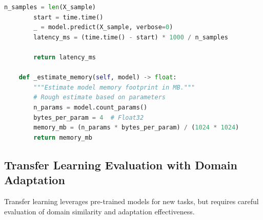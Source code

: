 \begin{lstlisting}[language=Python, caption={NAS with Deployment Constraints}]
        n_samples = len(X_sample)
        start = time.time()
        _ = model.predict(X_sample, verbose=0)
        latency_ms = (time.time() - start) * 1000 / n_samples

        return latency_ms

    def _estimate_memory(self, model) -> float:
        """Estimate model memory footprint in MB."""
        # Rough estimate based on parameters
        n_params = model.count_params()
        bytes_per_param = 4  # Float32
        memory_mb = (n_params * bytes_per_param) / (1024 * 1024)
        return memory_mb
\end{lstlisting}

\subsection{Transfer Learning Evaluation with Domain Adaptation}

Transfer learning leverages pre-trained models for new tasks, but requires careful evaluation of domain similarity and adaptation effectiveness.

